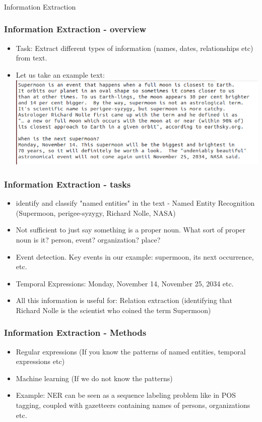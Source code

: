 \documentclass{beamer}
\begin{document}
\begin{frame}
\frametitle{}
\Large Information Extraction
\end{frame}

\begin{frame}
\frametitle{Information Extraction - overview}
\begin{itemize}
\item Task: Extract different types of information (names, dates, relationships etc) from text.
\item Let us take an example text:
\includegraphics[width=\textwidth]{supermoon.png}
\end{itemize}
\end{frame}

\begin{frame}
\frametitle{Information Extraction - tasks}
\begin{itemize}
\item identify and classify "named entities" in the text - Named Entity Recognition (Supermoon, perigee-syzygy, Richard Nolle, NASA)
\item Not sufficient to just say something is a proper noun. What sort of proper noun is it? person, event? organization? place? \pause
\item Event detection. Key events in our example: supermoon, its next occurrence, etc. \pause
\item Temporal Expressions: Monday, November 14, November 25, 2034 etc. \pause
\item All this information is useful for: Relation extraction (identifying that Richard Nolle is the scientist who coined the term Supermoon)
\end{itemize}
\end{frame}

\begin{frame}
\frametitle{Information Extraction - Methods}
\begin{itemize}
\item Regular expressions (If you know the patterns of named entities, temporal expressions etc)
\item Machine learning (If we do not know the patterns)
\item Example: NER can be seen as a sequence labeling problem like in POS tagging, coupled with gazetteers containing names of persons, organizations etc.
\end{itemize}
\end{frame}
\end{document}
